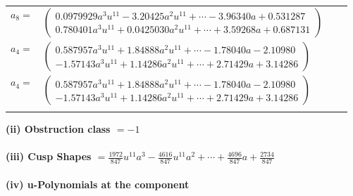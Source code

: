 \documentclass[1p]{elsarticle_modified}
\theoremstyle{definition}
\begin{document}
\begin{tabular}{m{7pt} m{180pt} m{7pt} m{180pt} }
\flushright $a_{8}=$&$\begin{pmatrix}0.0979929 a^{3} u^{11}-3.20425 a^{2} u^{11}+\cdots-3.96340 a+0.531287\\0.780401 a^{3} u^{11}+0.0425030 a^{2} u^{11}+\cdots+3.59268 a+0.687131\end{pmatrix}$ \\
\flushright $a_{4}=$&$\begin{pmatrix}0.587957 a^{3} u^{11}+1.84888 a^{2} u^{11}+\cdots-1.78040 a-2.10980\\-1.57143 a^{3} u^{11}+1.14286 a^{2} u^{11}+\cdots+2.71429 a+3.14286\end{pmatrix}$\\ \flushright $a_{4}=$&$\begin{pmatrix}0.587957 a^{3} u^{11}+1.84888 a^{2} u^{11}+\cdots-1.78040 a-2.10980\\-1.57143 a^{3} u^{11}+1.14286 a^{2} u^{11}+\cdots+2.71429 a+3.14286\end{pmatrix}$\\&\end{tabular}
\flushleft \textbf{(ii) Obstruction class $= -1$}\\~\\
\flushleft \textbf{(iii) Cusp Shapes $= \frac{1972}{847} u^{11} a^3-\frac{4616}{847} u^{11} a^2+\cdots+\frac{4696}{847} a+\frac{2734}{847}$}\\~\\
\newpage\renewcommand{\arraystretch}{1}
\flushleft \textbf{(iv) u-Polynomials at the component}\newline \\
\end{document}
